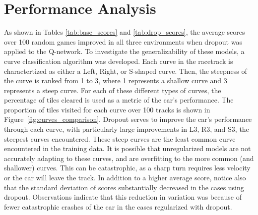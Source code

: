 \documentclass{article}
\begin{document}
\section{Performance Analysis}
As shown in Tables \ref{tab:base_scores} and \ref{tab:drop_scores},
the average scores over 100 random games improved in all three
environments when dropout was applied to the Q-network. To
investigate the generalizability of these models, a curve 
classification algorithm was developed. Each curve in the racetrack is
charactertized as either a Left, Right, or S-shaped curve. Then, the
steepness of the curve is ranked from 1 to 3, where 1 represents a
shallow curve and 3 represents a steep curve. 
For each of these different types of curves, the percentage
of tiles cleared is used as a metric of the car's performance. 
The proportion of tiles visited for each curve over 100 tracks is
shown in Figure~\ref{fig:curves_comparison}. Dropout serves to
improve the car's performance through each curve, with particularly
large improvements in L3, R3, and S3, the steepest curves
encountered. These steep curves are the least common curve encountered
in the training data. It is possible that unregularized models are not
accurately adapting to these curves, and are overfitting to the more
common (and shallower) curves. This can be catastrophic, as a sharp
turn requires less velocity or the car will leave the track. In
addition to a higher average score, notice also that the standard
deviation of scores substantially  decreased in the cases using
dropout. Observations indicate that this reduction in variation was
because of fewer catastrophic crashes of the car in the cases
regularized with dropout.  
\end{document}
